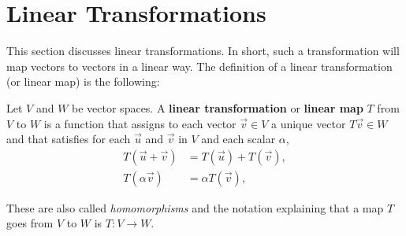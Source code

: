 \section{Linear Transformations}

This section discusses linear transformations.  In short, such a transformation will map vectors to vectors in a linear way.  The definition of a linear transformation (or linear map) is the following:

\begin{definition} \label{def:linear:trans}
 Let $V$ and $W$ be vector spaces.  A \textbf{linear transformation} or \textbf{linear map} $T$ from $V$ to $W$ is a function that assigns to each vector $\vec{v} \in V$ a unique vector $T\vec{v} \in W$ and that satisfies for each $\vec{u}$ and $\vec{v}$ in $V$ and each scalar $\alpha$, 
\begin{align} 
 T(\vec{u} + \vec{v}) & = T(\vec{u}) + T (\vec{v}), \label{eq:linear:map:add}\\
 T(\alpha \vec{v}) & = \alpha T (\vec{v}), \label{eq:linear:map:prod}
\end{align}
\end{definition}

These are also called \emph{homomorphisms} and the notation explaining that a map $T$ goes from $V$ to $W$ is $T: V \rightarrow W$.  

